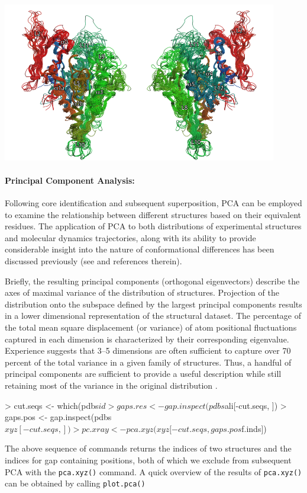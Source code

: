 \documentclass[a4paper]{article}
\begin{document}
\begin{center}
\includegraphics[width=120mm]{figs/fit.png}
\end{center}

\paragraph{Principal Component Analysis:}
Following core identification and subsequent superposition, PCA can be employed to examine the relationship between different structures based on their equivalent residues. The application of PCA to both distributions of experimental structures and molecular dynamics trajectories, along with its ability to provide considerable insight into the nature of conformational differences has been discussed previously (see \citet{grant07} and references therein).  

Briefly, the resulting principal components (orthogonal eigenvectors) describe the axes of maximal variance of the distribution of structures. Projection of the distribution onto the subspace defined by the largest principal components results in a lower dimensional representation of the structural dataset. The percentage of the total mean square displacement (or variance) of atom positional fluctuations captured in each dimension is characterized by their corresponding eigenvalue. Experience suggests that 3--5 dimensions are often sufficient to capture over 70 percent of the total variance in a given family of structures. Thus, a handful of principal components are sufficient to provide a useful description while still retaining most of the variance in the original distribution \citet{grant06}. 


\begin{Schunk}
\begin{Sinput}
> cut.seqs <- which(pdbs$id %
> gaps.res <- gap.inspect(pdbs$ali[-cut.seqs, ])
> gaps.pos <- gap.inspect(pdbs$xyz[-cut.seqs, ])
> pc.xray <- pca.xyz(xyz[-cut.seqs, gaps.pos$f.inds])
\end{Sinput}
\end{Schunk}
The above sequence of commands returns the indices of two structures and the indices for gap containing positions, both of which we exclude from subsequent PCA with the \texttt{pca.xyz()} command. A quick overview of the results of \texttt{pca.xyz()} can be obtained by calling \texttt{plot.pca()}
\end{document}
